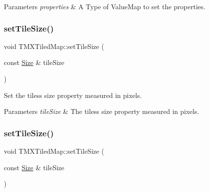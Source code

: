 \begin{DoxyParams}{Parameters}
{\em properties} & A Type of Value\+Map to set the properties. \\
\hline
\end{DoxyParams}
\mbox{\label{classTMXTiledMap_aad7629d19a124f34e0855daa5de7f247}} 
\subsubsection{\texorpdfstring{set\+Tile\+Size()}{setTileSize()}\hspace{0.1cm}{\footnotesize\ttfamily [1/2]}}
{\footnotesize\ttfamily void T\+M\+X\+Tiled\+Map\+::set\+Tile\+Size (\begin{DoxyParamCaption}\item[{const \hyperlink{classSize}{Size} \&}]{tile\+Size }\end{DoxyParamCaption})\hspace{0.3cm}{\ttfamily [inline]}}

Set the tiles\textquotesingle{}s size property measured in pixels.


\begin{DoxyParams}{Parameters}
{\em tile\+Size} & The tiles\textquotesingle{}s size property measured in pixels. \\
\hline
\end{DoxyParams}
\mbox{\label{classTMXTiledMap_aad7629d19a124f34e0855daa5de7f247}} 
\subsubsection{\texorpdfstring{set\+Tile\+Size()}{setTileSize()}\hspace{0.1cm}{\footnotesize\ttfamily [2/2]}}
{\footnotesize\ttfamily void T\+M\+X\+Tiled\+Map\+::set\+Tile\+Size (\begin{DoxyParamCaption}\item[{const \hyperlink{classSize}{Size} \&}]{tile\+Size }\end{DoxyParamCaption})\hspace{0.3cm}{\ttfamily [inline]}}

